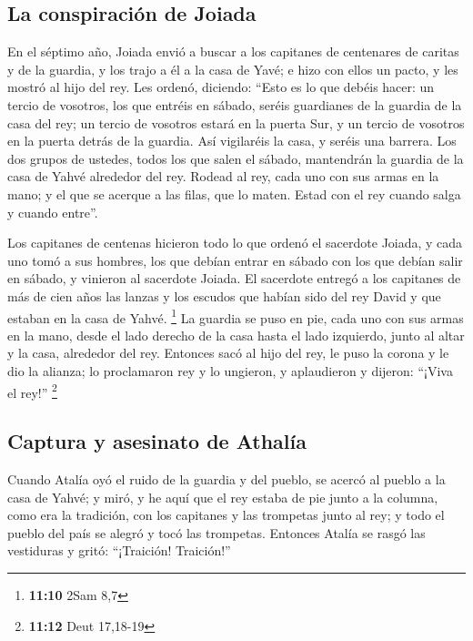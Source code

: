 \hypertarget{la-conspiraciuxf3n-de-joiada}{%
\subsection{La conspiración de
Joiada}\label{la-conspiraciuxf3n-de-joiada}}

 En el séptimo año, Joiada envió a buscar a los capitanes
de centenares de caritas y de la guardia, y los trajo a él a la casa de
Yavé; e hizo con ellos un pacto, y les mostró al hijo del rey.
 Les ordenó, diciendo: ``Esto es lo que debéis hacer: un
tercio de vosotros, los que entréis en sábado, seréis guardianes de la
guardia de la casa del rey;  un tercio de vosotros estará
en la puerta Sur, y un tercio de vosotros en la puerta detrás de la
guardia. Así vigilaréis la casa, y seréis una barrera. 
Los dos grupos de ustedes, todos los que salen el sábado, mantendrán la
guardia de la casa de Yahvé alrededor del rey.  Rodead al
rey, cada uno con sus armas en la mano; y el que se acerque a las filas,
que lo maten. Estad con el rey cuando salga y cuando entre''.

 Los capitanes de centenas hicieron todo lo que ordenó el
sacerdote Joiada, y cada uno tomó a sus hombres, los que debían entrar
en sábado con los que debían salir en sábado, y vinieron al sacerdote
Joiada.  El sacerdote entregó a los capitanes de más de
cien años las lanzas y los escudos que habían sido del rey David y que
estaban en la casa de Yahvé. \footnote{\textbf{11:10} 2Sam 8,7}
 La guardia se puso en pie, cada uno con sus armas en la
mano, desde el lado derecho de la casa hasta el lado izquierdo, junto al
altar y la casa, alrededor del rey.  Entonces sacó al
hijo del rey, le puso la corona y le dio la alianza; lo proclamaron rey
y lo ungieron, y aplaudieron y dijeron: ``¡Viva el rey!'' \footnote{\textbf{11:12}
  Deut 17,18-19}

\hypertarget{captura-y-asesinato-de-athaluxeda}{%
\subsection{Captura y asesinato de
Athalía}\label{captura-y-asesinato-de-athaluxeda}}

 Cuando Atalía oyó el ruido de la guardia y del pueblo,
se acercó al pueblo a la casa de Yahvé;  y miró, y he
aquí que el rey estaba de pie junto a la columna, como era la tradición,
con los capitanes y las trompetas junto al rey; y todo el pueblo del
país se alegró y tocó las trompetas. Entonces Atalía se rasgó las
vestiduras y gritó: ``¡Traición! Traición!''

